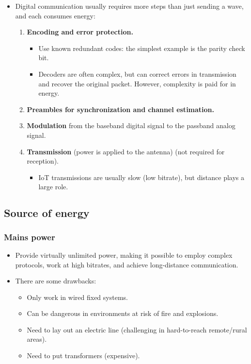 \begin{itemize}
    \item Digital communication usually requires more steps than just sending a wave, and each consumes energy:
    \begin{enumerate}
        \item \textbf{Encoding and error protection.}
        \begin{itemize}
            \item Use known redundant codes: the simplest example is the parity check bit.
            \item Decoders are often complex, but can correct errors in transmission and recover the original packet. However, complexity is paid for in energy.
        \end{itemize}
        
        \item \textbf{Preambles for synchronization and channel estimation.}
        \item \textbf{Modulation} from the baseband digital signal to the passband analog signal.
        \item \textbf{Transmission} (power is applied to the antenna) (not required for reception).
        \begin{itemize}
            \item IoT transmissions are usually slow (low bitrate), but distance plays a large role.
        \end{itemize}
    \end{enumerate}
\end{itemize}

\subsection{Source of energy}

\subsubsection{Mains power}
\begin{itemize}
    \item Provide virtually unlimited power, making it possible to employ complex protocols, work at high bitrates, and achieve long-distance communication.
    \item There are some drawbacks:
    \begin{itemize}
        \item Only work in wired fixed systems.
        \item Can be dangerous in environments at risk of fire and explosions.
        \item Need to lay out an electric line (challenging in hard-to-reach remote/rural areas).
        \item Need to put transformers (expensive).
    \end{itemize}
\end{itemize}

